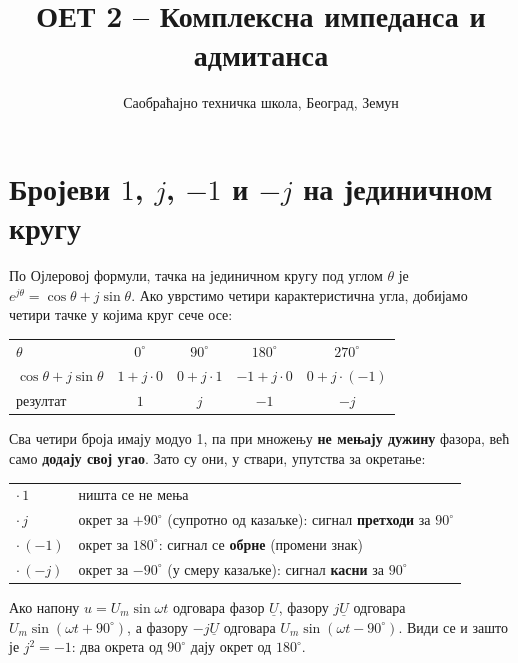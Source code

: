 \documentclass{article}
\title{ОЕТ 2 -- Комплексна импеданса и адмитанса}
\author{Саобраћајно техничка школа, Београд, Земун}
\date{}
\begin{document}
\maketitle

\section{Бројеви $1$, $j$, $-1$ и $-j$ на јединичном кругу}

По Ојлеровој формули, тачка на јединичном кругу под углом $\theta$ је
$e^{j\theta} = \cos\theta + j\sin\theta$. Ако уврстимо четири карактеристична
угла, добијамо четири тачке у којима круг сече осе:

\begin{center}
\renewcommand{\arraystretch}{1.3}
\begin{tabular}{lcccc}
    \toprule
    $\theta$                    & $0^\circ$      & $90^\circ$     & $180^\circ$     & $270^\circ$ \\
    $\cos\theta + j\sin\theta$  & $1 + j\cdot 0$ & $0 + j\cdot 1$ & $-1 + j\cdot 0$ & $0 + j\cdot(-1)$ \\
    резултат                    & $1$            & $j$            & $-1$            & $-j$ \\
    \bottomrule
\end{tabular}
\end{center}

Сва четири броја имају модуо 1, па при множењу \textbf{не мењају дужину}
фазора, већ само \textbf{додају свој угао}. Зато су они, у ствари, упутства
за окретање:

\begin{kljucno}
\begin{tabular}{ll}
    $\cdot\,1$    & ништа се не мења \\
    $\cdot\,j$    & окрет за $+90^\circ$ (супротно од казаљке): сигнал \textbf{претходи} за $90^\circ$ \\
    $\cdot\,(-1)$ & окрет за $180^\circ$: сигнал се \textbf{обрне} (промени знак) \\
    $\cdot\,(-j)$ & окрет за $-90^\circ$ (у смеру казаљке): сигнал \textbf{касни} за $90^\circ$ \\
\end{tabular}
\end{kljucno}

Ако напону $u = U_m\sin\omega t$ одговара фазор $\underline{U}$, фазору
$j\underline{U}$ одговара $U_m\sin(\omega t + 90^\circ)$, а фазору $-j\underline{U}$
одговара $U_m\sin(\omega t - 90^\circ)$. Види се и зашто је $j^2 = -1$: два окрета
од $90^\circ$ дају окрет од $180^\circ$.
\end{document}
